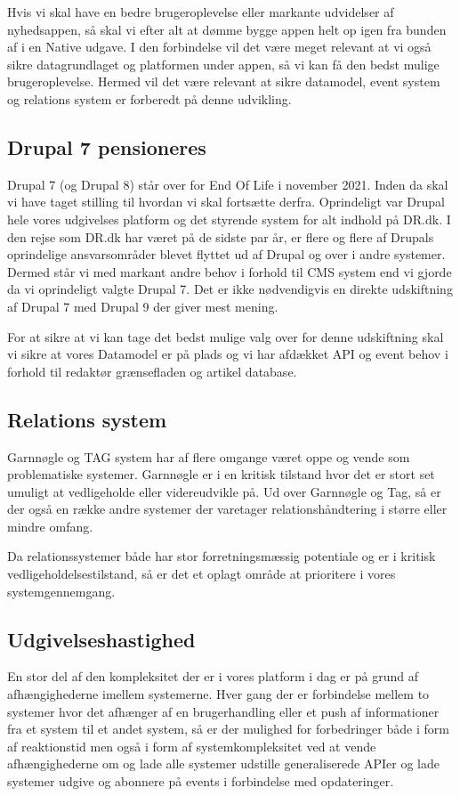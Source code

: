 \documentclass{article}
\begin{document}
Hvis vi skal have en bedre brugeroplevelse eller markante udvidelser af nyhedsappen, så skal vi efter alt at dømme bygge appen helt op igen fra bunden af i en Native udgave. I den forbindelse vil det være meget relevant at vi også sikre datagrundlaget og platformen under appen, så vi kan få den bedst mulige brugeroplevelse.
Hermed vil det være relevant at sikre datamodel, event system og relations system er forberedt på denne udvikling.


\subsection{Drupal 7 pensioneres}
Drupal 7 (og Drupal 8) står over for End Of Life i november 2021. Inden da skal vi have taget stilling til hvordan vi skal fortsætte derfra.
Oprindeligt var Drupal hele vores udgivelses platform og det styrende system for alt indhold på DR.dk. I den rejse som DR.dk har været på de sidste par år, er flere og flere af Drupals oprindelige ansvarsområder blevet flyttet ud af Drupal og over i andre systemer. Dermed står vi med markant andre behov i forhold til CMS system end vi gjorde da vi oprindeligt valgte Drupal 7. Det er ikke nødvendigvis en direkte udskiftning af Drupal 7 med Drupal 9 der giver mest mening. 

For at sikre at vi kan tage det bedst mulige valg over for denne udskiftning skal vi sikre at vores Datamodel er på plads og vi har afdækket API og event behov i forhold til redaktør grænsefladen og artikel database. 


\subsection{Relations system}
Garnnøgle og TAG system har af flere omgange været oppe og vende som problematiske systemer. Garnnøgle er i en kritisk tilstand hvor det er stort set umuligt at vedligeholde eller videreudvikle på. Ud over Garnnøgle og Tag, så er der også en række andre systemer der varetager relationshåndtering i større eller mindre omfang.

Da relationssystemer både har stor forretningsmæssig potentiale og er i kritisk vedligeholdelsestilstand, så er det et oplagt område at prioritere i vores systemgennemgang.


\subsection{Udgivelseshastighed}
En stor del af den kompleksitet der er i vores platform i dag er på grund af afhængighederne imellem systemerne. Hver gang der er forbindelse mellem to systemer hvor det afhænger af en brugerhandling eller et push af informationer fra et system til et andet system, så er der mulighed for forbedringer både i form af reaktionstid men også i form af systemkompleksitet ved at vende afhængighederne om og lade alle systemer udstille generaliserede APIer og lade systemer udgive og abonnere på events i forbindelse med opdateringer.
\end{document}
